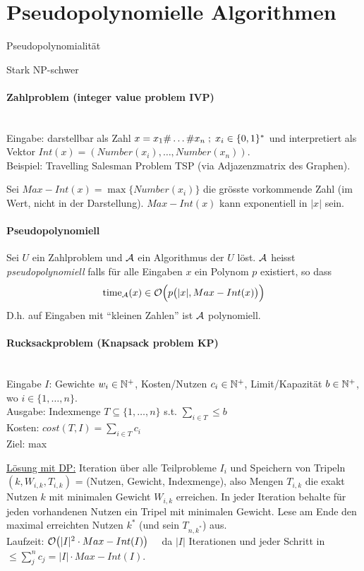 \section{Pseudopolynomielle Algorithmen}

\begin{takeaway}
    \item Pseudopolynomialität
    \item Stark NP-schwer
\end{takeaway}

\paragraph{Zahlproblem (integer value problem IVP)} \mbox{} \\
Eingabe: darstellbar als Zahl $ x = x_1 \# \dots \# x_n \; ; \; x_i \in \lbrace 0, 1 \rbrace^* $
und interpretiert als Vektor $Int(x) = (Number(x_i), \dots, Number(x_n))$. \\
Beispiel: Travelling Salesman Problem TSP (via Adjazenzmatrix des Graphen).

Sei $Max-Int(x) = \max \{ Number(x_i) \}$ die grösste vorkommende Zahl (im Wert, nicht in der Darstellung).
$Max-Int(x)$ kann exponentiell in $|x|$ sein.

\paragraph{Pseudopolynomiell}
Sei $U$ ein Zahlproblem und $\mathcal{A}$ ein Algorithmus der $U$ löst.
$\mathcal{A}$ heisst \emph{pseudopolynomiell} falls für alle Eingaben $x$ ein Polynom $p$ existiert, so dass
$$ \text{time}_{\mathcal{A}} (x) \in \mathcal{O} \Big( p \big( |x| , Max-Int(x) \big) \Big) $$
D.h. auf Eingaben mit ``kleinen Zahlen'' ist $\mathcal{A}$ polynomiell.

\paragraph{Rucksackproblem (Knapsack problem KP)} \mbox{} \\
Eingabe $I$: Gewichte $w_i \in \mathbb{N}^+$, Kosten/Nutzen $c_i \in \mathbb{N}^+$, Limit/Kapazität $b \in \mathbb{N}^+$, wo $i \in \{ 1, \dots, n \} $. \\
Ausgabe: Indexmenge $T \subseteq \{ 1, \dots, n \}$ s.t. $\sum_{i \in T } \leq b$ \\
Kosten: $cost(T, I) = \sum_{i \in T} c_i$ \\
Ziel: max

\underline{Lösung mit DP:}
Iteration über alle Teilprobleme $I_i$ und Speichern von Tripeln
$(k, W_{i, k}, T_{i, k})$ = (Nutzen, Gewicht, Indexmenge), also Mengen $T_{i, k}$
die exakt Nutzen $k$ mit minimalen Gewicht $W_{i, k}$ erreichen.
In jeder Iteration behalte für jeden vorhandenen Nutzen ein Tripel mit minimalen Gewicht.
Lese am Ende den maximal erreichten Nutzen $k^*$ (und sein $T_{n, k^*}$) aus.
\\
Laufzeit: $ \mathcal{O} \big( |I|^2 \cdot Max-Int(I) \big) \quad$ da $|I|$ Iterationen und
jeder Schritt in $\leq \sum_j^n c_j = |I| \cdot Max-Int(I)$.

